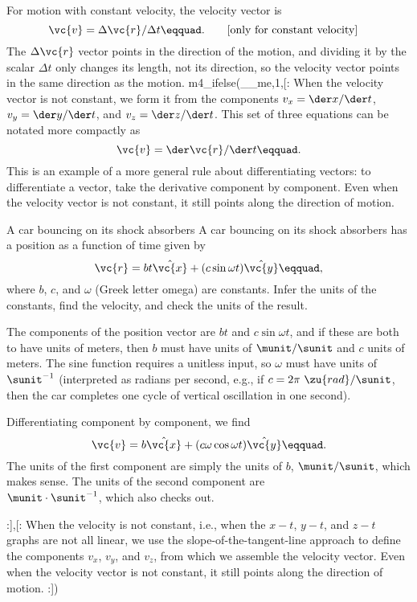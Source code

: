 For motion with constant velocity, the velocity vector is
\begin{equation*}
        \vc{v} = \Delta \vc{r}/\Delta t\eqquad. \qquad \hfill \shoveright{\text{[only for constant velocity]}}
\end{equation*}
The $\Delta\vc{r}$ vector points in the direction of the motion,
and dividing it by the scalar $\Delta t$ only changes its
length, not its direction, so the velocity vector points in
the same direction as the motion.
m4_ifelse(__me,1,[:%
  When the velocity vector is not constant, we form it from the components
  $v_x=\der x/\der t$, $v_y=\der y/\der t$, and $v_z=\der z/\der t$.
  This set of three equations can be notated more compactly as
  \begin{equation*}
    \vc{v}=\der\vc{r}/\der t\eqquad.
  \end{equation*}
  This is an example of a more general rule about differentiating vectors: to differentiate a vector,
  take the derivative component by component.
  Even when the velocity vector
  is not constant, it still points along the direction of motion.

  \begin{eg}{A car bouncing on its shock absorbers}
  \egquestion
  A car bouncing on its shock absorbers has a position as a function of time given by
  \begin{equation*}
    \vc{r} = bt\hat{\vc{x}}+(c\sin\omega t)\hat{\vc{y}}\eqquad,
  \end{equation*}
  where $b$, $c$, and $\omega$ (Greek letter omega) are constants.
  Infer the units of the constants, find the velocity, and check the units of
  the result.

  \eganswer
  The components of the position vector are $bt$ and $c\sin\omega t$, and if these
  are both to have units of meters, then $b$ must have units of $\munit/\sunit$ and $c$ units of meters.
  The sine function requires a unitless input, so $\omega$ must have units of $\sunit^{-1}$ (interpreted
  as radians per second, e.g., if $c=2\pi\ \zu{rad}/\sunit$, then the car completes one cycle of vertical
  oscillation in one second).

  Differentiating component by component, we find
  \begin{equation*}
    \vc{v} = b\hat{\vc{x}}+(c\omega\cos\omega t)\hat{\vc{y}}\eqquad.
  \end{equation*}
  The units of the first component are simply the units of $b$, $\munit/\sunit$, which makes sense.
  The units of the second component are \\
  $\munit\cdot\sunit^{-1}$, which also checks out.
  \end{eg}
:],[:%
  When the velocity is not
  constant, i.e., when the $x-t$, $y-t$, and $z-t$ graphs are not
  all linear, we use the slope-of-the-tangent-line approach to
  define the components $v_x$, $v_y$, and $v_z$, from which we
  assemble the velocity vector.
  Even when the velocity vector
  is not constant, it still points along the direction of motion.
:])%

